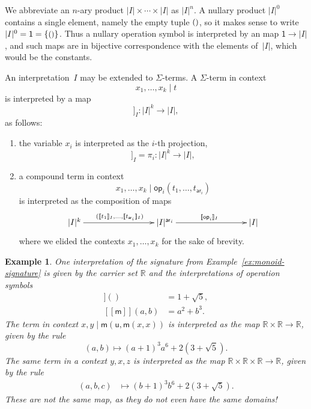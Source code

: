 \documentclass{amsart}
\newcommand{\RR}{\mathbb{R}} %
\newcommand{\carrier}[1]{|#1|} %
\newcommand{\set}[1]{\{#1\}} %
\newcommand{\op}[1]{\mathsf{op}_{#1}} %
\newcommand{\arity}[1]{\mathsf{ar}_{#1}} %
\newcommand{\one}{\mathsf{1}} %
\newcommand{\unit}{{\text{\small$()$}}} %
\newcommand{\sem}[1]{[\![#1]\!]} %
\newtheorem{example}{Example}[section]
\begin{document}
We abbreviate an $n$-ary product $\carrier{I} \times \cdots \times \carrier{I}$ as $\carrier{I}^n$. A
nullary product $\carrier{I}^0$ contains a single element, namely the empty tuple
$\unit$, so it makes sense to write $\carrier{I}^0 = \one = \set{\unit}$. Thus a nullary
operation symbol is interpreted by an map $\one \to \carrier{I}$, and such maps are in
bijective correspondence with the elements of~$\carrier{I}$, which would be the constants.

An interpretation~$I$ may be extended to $\Sigma$-terms. A $\Sigma$-term in context
%
\begin{equation*}
  x_1, \ldots, x_k \mid t
\end{equation*}
%
is interpreted by a map
%
\begin{equation*}
  \sem{x_1, \ldots, x_k \mid t}_I : \carrier{I}^k \to \carrier{I},
\end{equation*}
%
as follows:
%
\begin{enumerate}
\item the variable $x_i$ is interpreted as the $i$-th projection,
  \begin{equation*}
    \sem{x_1, \ldots, x_k \mid  x_i}_I = \pi_i : \carrier{I}^k \to \carrier{I},
  \end{equation*}
\item a compound term in context
  \begin{equation*}
    x_1, \ldots, x_k \mid \op{i}(t_1, \ldots, t_{\arity{i}})
  \end{equation*}
  is interpreted as the composition of maps
  \begin{equation*}
    \xymatrix@+6em{
      {\carrier{I}^k} \ar[r]^{(\sem{t_1}_I, \ldots, \sem{t_{\arity{i}}}_I)}
      &
      {\carrier{I}^{\arity{i}}} \ar[r]^{\sem{\op{i}}_I}
      &
      {\carrier{I}}
    }
  \end{equation*}
  where we elided the contexts $x_1, \ldots, x_k$ for the sake of brevity.
\end{enumerate}

\begin{example}
  One interpretation of the signature from Example~\ref{ex:monoid-signature} is given by
  the carrier set $\RR$ and the interpretations of operation symbols
  \begin{align*}
    \sem{\mathsf{u}}() &= 1 + \sqrt{5}, \\
    \sem{\mathsf{m}}(a, b) &= a^2 + b^3.
  \end{align*}
  The term in context $x, y \mid \mathsf{m}(\mathsf{u}, \mathsf{m}(x, x))$ is interpreted
  as the map $\RR \times \RR \to \RR$, given by the rule
  \begin{equation*}
    (a, b) \mapsto (a+1)^3 a^6 + 2 (3 + \sqrt{5}).
  \end{equation*}
  The same term in a context $y, x, z$ is interpreted as the map $\RR \times \RR \times \RR \to \RR$,
  given by the rule
  \begin{align*}
    (a, b, c) &\mapsto (b+1)^3 b^6 + 2 (3 + \sqrt{5}).
  \end{align*}
  These are not the same map, as they do not even have the same domains!
\end{example}
\end{document}
